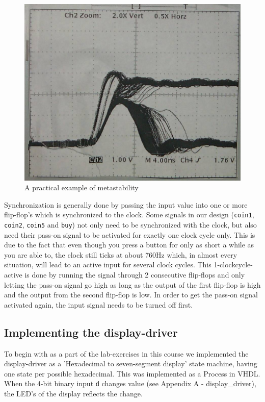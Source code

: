 \begin{figure}[!h]
\centering
\includegraphics[scale=0.3]{figs/meta_pic.jpg} 
\caption{A practical example of metastability}
\label{fig:meta}
\end{figure}

Synchronization is generally done by passing the input value into one or more flip-flop's which is synchronized to the clock. Some signals in our design (\texttt{coin1}, \texttt{coin2}, \texttt{coin5} and \texttt{buy}) not only need to be synchronized with the clock, but also need their pass-on signal to be activated for exactly one clock cycle only. This is due to the fact that even though you press a button for only as short a while as you are able to, the clock still ticks at about 760Hz which, in almost every situation, will lead to an active input for several clock cycles. This 1-clockcycle-active is done by running the signal through 2 consecutive flip-flops and only letting the pass-on signal go high as long as the output of the first flip-flop is high and the output from the second flip-flop is low. In order to get the pass-on signal activated again, the input signal needs to be turned off first. 

\subsection{Implementing the display-driver}
To begin with as a part of the lab-exercises in this course we implemented the display-driver as a 'Hexadecimal to seven-segment display' state machine, having one state per possible hexadecimal. This was implemented as a Process in VHDL. When the 4-bit binary input \texttt{d} changes value (see Appendix A - display\_driver), the LED's of the display reflects the change.\\

